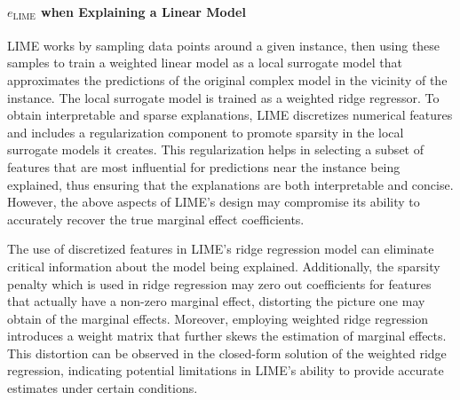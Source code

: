 \documentclass[12pt]{article}  %
\begin{document}
        \paragraph{$e_{\text{LIME}}$ when Explaining a Linear Model}
            \label{sec:lime_linear_case}
             LIME works by sampling data points around a given instance, then using these samples to train a weighted linear model as a local surrogate model that approximates the predictions of the original complex model in the vicinity of the instance. The local surrogate model is trained as a weighted ridge regressor. To obtain interpretable and sparse explanations, LIME discretizes numerical features and includes a regularization component to promote sparsity in the local surrogate models it creates. This regularization helps in selecting a subset of features that are most influential for predictions near the instance being explained, thus ensuring that the explanations are both interpretable and concise. However, the above aspects of LIME's design may compromise its ability to accurately recover the true marginal effect coefficients. 
             
             The use of discretized features in LIME's ridge regression model can eliminate critical information about the  model being explained. Additionally, the sparsity penalty which is used in ridge regression may zero out coefficients for features that actually have a non-zero marginal effect, distorting the picture one may obtain of the marginal effects. Moreover, employing weighted ridge regression introduces a weight matrix that further skews the estimation of marginal effects. This distortion can be observed in the closed-form solution of the weighted ridge regression, indicating potential limitations in LIME's ability to provide accurate estimates under certain conditions.
             
\end{document}
